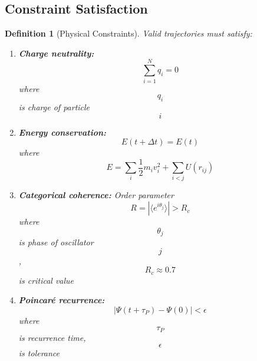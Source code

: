\documentclass[11pt,twocolumn,a4paper]{article}
\newtheorem{definition}[theorem]{Definition}
\theoremstyle{remark}
\begin{document}
\subsection{Constraint Satisfaction}

\begin{definition}[Physical Constraints]
\label{def:constraints}
Valid trajectories must satisfy:
\begin{enumerate}
\item \textbf{Charge neutrality:} $$\sum_{i=1}^N q_i = 0$$ where $$q_i$$ is charge of particle $$i$$
\item \textbf{Energy conservation:} $$E(t + \Delta t) = E(t)$$ where $$E = \sum_i \frac{1}{2}m_i v_i^2 + \sum_{i<j} U(r_{ij})$$
\item \textbf{Categorical coherence:} Order parameter $$R = |\langle e^{i\theta_j}\rangle| > R_c$$ where $$\theta_j$$ is phase of oscillator $$j$$, $$R_c \approx 0.7$$ is critical value
\item \textbf{Poincaré recurrence:} $$|\Psi(t + \tau_P) - \Psi(0)| < \epsilon$$ where $$\tau_P$$ is recurrence time, $$\epsilon$$ is tolerance
\end{enumerate}
\end{definition}
\end{document}
